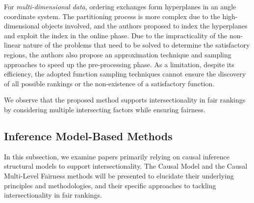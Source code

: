 


For \emph{multi-dimensional data}, ordering exchanges form hyperplanes in an angle coordinate system. The partitioning process is more complex due to the high-dimensional objects involved, and the authors proposed to index the hyperplanes and exploit the index in the online phase. Due to the impracticality of the non-linear nature of the problems that need to be solved to determine the satisfactory regions, the authors also propose an approximation technique and sampling approaches to speed up the pre-processing phase. As a limitation, despite its efficiency, the adopted function sampling techniques cannot ensure the discovery of all possible rankings or the non-existence of a satisfactory function.

We observe that the proposed method supports intersectionality in fair rankings by considering multiple intersecting factors while ensuring fairness.

\subsection{Inference Model-Based Methods}
\label{subsec:intrank_meth_inf}

In this subsection, we examine papers primarily relying on causal inference structural models to support intersectionality. The Causal Model and the Causal Multi-Level Fairness methods will be presented to elucidate their underlying principles and methodologies, and their specific approaches to tackling intersectionality in fair rankings.
 

